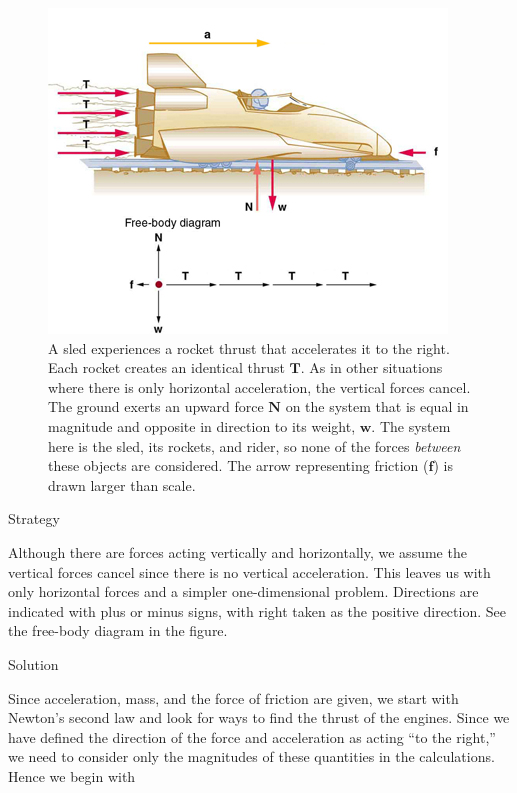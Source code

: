 \documentclass[
]{book}
\newenvironment{tinysection}{}{}
\begin{document}
\begin{figure}
\hypertarget{fs-id2407992}{%
\centering
\includegraphics{images/Figure_04_03_04.jpg}
\caption{A sled experiences a rocket thrust that accelerates it to the right.
Each rocket creates an identical thrust \(\textbf{T}{}\). As in other
situations where there is only horizontal acceleration, the vertical
forces cancel. The ground exerts an upward force \(\textbf{N}{}\) on the
system that is equal in magnitude and opposite in direction to its
weight, \(\textbf{w}{}\). The system here is the sled, its rockets, and
rider, so none of the forces \emph{between} these objects are considered. The
arrow representing friction (\(\textbf{f}{}\)) is drawn larger than
scale.}\label{fs-id2407992}
}
\end{figure}

\begin{tinysection}

{Strategy}

\end{tinysection}

Although there are forces acting vertically and horizontally, we assume
the vertical forces cancel since there is no vertical acceleration. This
leaves us with only horizontal forces and a simpler one-dimensional
problem. Directions are indicated with plus or minus signs, with right
taken as the positive direction. See the free-body diagram in the
figure.

\begin{tinysection}

{Solution}

\end{tinysection}

Since acceleration, mass, and the force of friction are given, we start
with Newton's second law and look for ways to find the thrust of the
engines. Since we have defined the direction of the force and
acceleration as acting ``to the right,'' we need to consider only the
magnitudes of these quantities in the calculations. Hence we begin with
\end{document}
